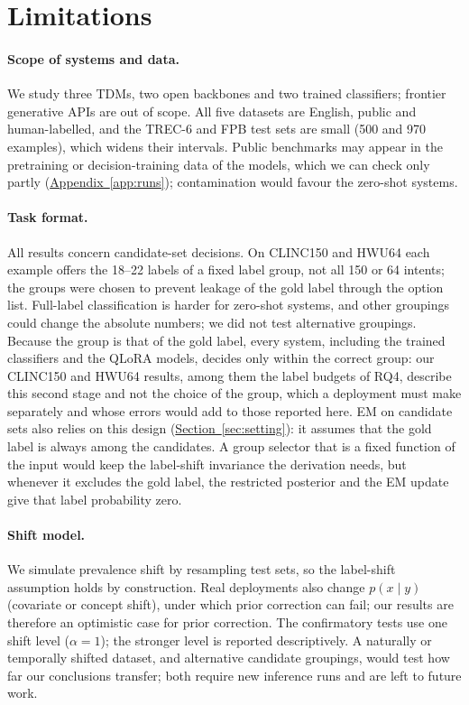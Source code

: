 \section{Limitations}
\label{sec:limitations}

\paragraph{Scope of systems and data.}
We study three TDMs, two open backbones and two trained classifiers; frontier generative APIs are out of scope. All
five datasets are English, public and human-labelled, and the TREC-6 and FPB test sets are small (500 and 970
examples), which widens their intervals. Public benchmarks may appear in the pretraining or decision-training data of
the models, which we can check only partly (\hyperref[app:runs]{Appendix~\ref*{app:runs}}); contamination would favour the zero-shot systems.

\paragraph{Task format.}
All results concern candidate-set decisions. On CLINC150 and HWU64 each example offers the 18--22 labels of a fixed label
group, not all 150 or 64 intents; the groups were chosen to prevent leakage of the gold label through the option list.
Full-label classification is harder for zero-shot systems, and other groupings could change the absolute numbers; we did
not test alternative groupings. Because the group is that of the gold label, every system, including the trained
classifiers and the QLoRA models, decides only within the correct group: our CLINC150 and HWU64 results, among them the
label budgets of RQ4, describe this second stage and not the choice of the group, which a deployment must make
separately and whose errors would add to those reported here. EM on candidate sets also relies on this design
(\hyperref[sec:setting]{Section~\ref*{sec:setting}}): it assumes that the gold label is always among the candidates. A
group selector that is a fixed function of the input would keep the label-shift invariance the derivation needs, but
whenever it excludes the gold label, the restricted posterior and the EM update give that label probability zero.

\paragraph{Shift model.}
We simulate prevalence shift by resampling test sets, so the label-shift assumption holds by construction. Real
deployments also change $p(x\mid y)$ (covariate or concept shift), under which prior correction can fail; our results
are therefore an optimistic case for prior correction. The confirmatory tests use one shift level ($\alpha=1$); the
stronger level is reported descriptively. A naturally or temporally shifted dataset, and alternative candidate
groupings, would test how far our conclusions transfer; both require new inference runs and are left to future work.

